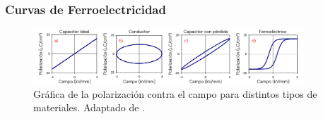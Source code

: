 \documentclass[../main.tex]{subfiles}
\begin{document}
\subsubsection{Curvas de Ferroelectricidad}
\begin{figure}[H]
    \centering
    \includegraphics[width=0.9\textwidth]{fig/polardiag.png}
    \caption{Gráfica de la polarización contra el campo para distintos tipos de materiales. Adaptado de \cite{Stewart1999}.}
    \label{fig:polardiag}
\end{figure}
\end{document}
